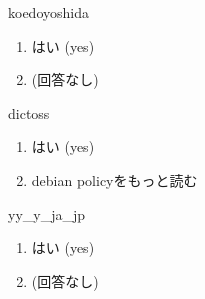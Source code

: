 \begin{prework}{ koedoyoshida }
  \begin{enumerate}
  \item はい (yes)
  \item (回答なし)
 \end{enumerate}
\end{prework}

\begin{prework}{ dictoss }
  \begin{enumerate}
  \item はい (yes)
  \item debian policyをもっと読む
  \end{enumerate}
\end{prework}

\begin{prework}{ yy\_y\_ja\_jp }
  \begin{enumerate}
  \item はい (yes)
  \item (回答なし)
  \end{enumerate}
\end{prework}

